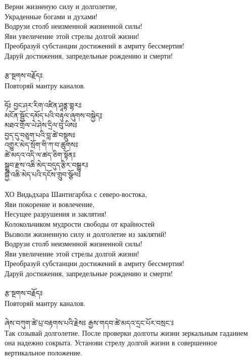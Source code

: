 Верни жизненую силу и долголетие,\\
Украденные богами и духами!\\
Водрузи столб неизменной жизненной силы!\\
Яви увеличение этой стрелы долгой жизни!\\
Преобразуй субстанции достижений в амриту бессмертия!\\
Даруй достижения, запредельные рождению и смерти!\\
\\
{\ti རྩ་སྔགས་བརྗོདཿ }\\
Повторяй мантру каналов.\\
\\
{\ti ཧོཿ བྱང་ཤར་རིག་འཛིན་ཤཱནྟ་གྷརཿ \\
མངོན་སྦྱོང་དམོད་པའི་བརྟུལ་ཞུགས་བསྐྱེད༔ \\
མཐའ་གྲོལ་ཡེ་ཤེས་དྲིལ་བུ་ཡིསཿ \\
བྱད་དུ་བཅུག་པའི་བླ་ཚེ་བསྡུསཿ \\
འགྱུར་མེད་སྲོག་གི་ཀ་བ་ཚུགསཿ \\
ཚེ་མདའ་འདི་ལ་ཚད་ཅིག་སྟོནཿ \\
སྒྲུབ་རྫས་འཆི་མེད་བདུད་རྩིར་བསྒྱུརཿ\\ 
སྐྱེ་འཆི་མེད་པའི་དངོས་གྲུབ་སྩོལཿ }\\
\\
ХО  Видьдхара Шантигарбха с северо-востока,\\
Яви покорение и вовлечение,\\
Несущее разрушения и заклятия!\\
Колокольчиком мудрости свободы от крайностей\\
Вызволи жизненную силу и долголетие из заклятий!\\
Водрузи столб неизменной жизненной силы!\\
Яви увеличение этой стрелы долгой жизни!\\
Преобразуй субстанции достижений в амриту бессмертия!\\
Даруй достижения, запредельные рождению и смерти!\\
\\
{\ti རྩ་སྔགས་བརྗོདཿ }\\
Повторяй мантру каналов.\\
\\
{\ti ཞེས་བཀུག་ཚེ་པྲ་བརྟགས་པའི་རྗེསཿ  རྒྱས་གདབ་ཚེ་མདའ་དྲང་པོར་བསྲང་ཿ }\\
Так созывай долголетие. После проверки долготы жизни зеркальным гаданием она надежно сокрыта. Установи стрелу долгой жизни в совершенное вертикальное положение.\\
